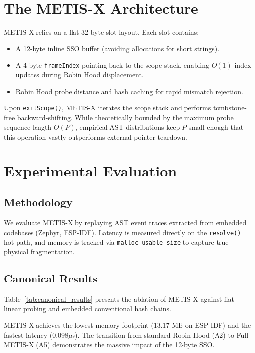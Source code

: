 \documentclass[sigconf]{acmart}
\begin{document}
\section{The METIS-X Architecture}
METIS-X relies on a flat 32-byte slot layout. Each slot contains:
\begin{itemize}
    \item A 12-byte inline SSO buffer (avoiding allocations for short strings).
    \item A 4-byte \texttt{frameIndex} pointing back to the scope stack, enabling $O(1)$ index updates during Robin Hood displacement.
    \item Robin Hood probe distance and hash caching for rapid mismatch rejection.
\end{itemize}

Upon \texttt{exitScope()}, METIS-X iterates the scope stack and performs tombstone-free backward-shifting. While theoretically bounded by the maximum probe sequence length $O(P)$, empirical AST distributions keep $P$ small enough that this operation vastly outperforms external pointer teardown.

\section{Experimental Evaluation}
\subsection{Methodology}
We evaluate METIS-X by replaying AST event traces extracted from embedded codebases (Zephyr, ESP-IDF). Latency is measured directly on the \texttt{resolve()} hot path, and memory is tracked via \texttt{malloc\_usable\_size} to capture true physical fragmentation.

\subsection{Canonical Results}
Table~\ref{tab:canonical_results} presents the ablation of METIS-X against flat linear probing and embedded conventional hash chains.

METIS-X achieves the lowest memory footprint (13.17 MB on ESP-IDF) and the fastest latency (0.098$\mu$s). The transition from standard Robin Hood (A2) to Full METIS-X (A5) demonstrates the massive impact of the 12-byte SSO.
\end{document}
